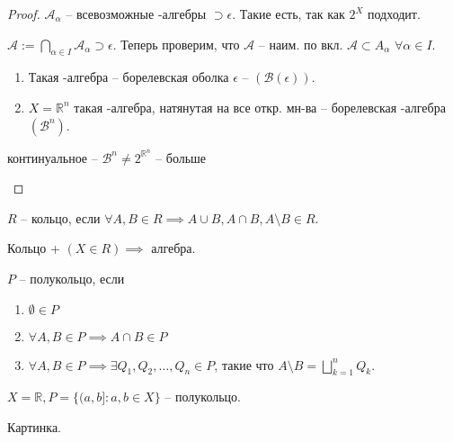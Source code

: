 \begin{proof}
    $\mathcal{A}_{\alpha}$ -- всевозможные \sigma-алгебры $\supset \epsilon$. Такие есть, так как $2^X$ подходит.

    $\mathcal{A} := \bigcap_{\alpha \in I} \mathcal{A}_{\alpha} \supset \epsilon$. Теперь проверим, что $\mathcal{A}$ -- наим. по вкл. $\mathcal{A} \subset A_{\alpha}$ $\forall \alpha \in I$.

    \begin{definition}
        \begin{enumerate}
            \item Такая \sigma-алгебра -- борелевская оболка $\epsilon$ -- $(\mathcal{B}(\epsilon))$.
            \item $X = \mathbb{R}^n$ такая \sigma-алгебра, натянутая на все откр. мн-ва -- борелевская \sigma-алгебра $(\mathcal{B}^n)$.
        \end{enumerate}
    \end{definition}

    \begin{remark}
        континуальное -- $\mathcal{B}^n \neq 2^{\mathbb{R}^n}$ -- больше
    \end{remark}
\end{proof}

\begin{definition}
    $R$ -- кольцо, если $\forall A, B \in R \implies A \cup B, A \cap B, A \setminus B \in R$.
\end{definition}

\begin{remark}
    Кольцо + $(X \in R) \implies$ алгебра.
\end{remark}

\begin{definition}
    $P$ -- полукольцо, если 
    \begin{enumerate}
        \item $\emptyset \in P$
        \item $\forall A, B \in P \implies A \cap B \in P$
        \item $\forall A, B \in P \implies \exists Q_1, Q_2, \dots, Q_n \in P$, такие что $A \setminus B = \bigsqcup_{k = 1}^{n}Q_k$.
    \end{enumerate}
\end{definition}

\begin{example}
    $X = \mathbb{R}, P = \{(a, b] : a, b \in X\}$ -- полукольцо.

    Картинка.
\end{example}

